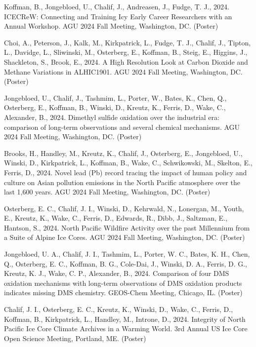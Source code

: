\documentclass[a4paper,11pt]{article}
\begin{document}
\item[\textbf{2024}] Koffman, B., Jongebloed, U., Chalif, J., Andreasen, J., Fudge, T. J., 2024. ICECReW: Connecting and Training Icy Early Career Researchers with an Annual Workshop. AGU 2024 Fall Meeting, Washington, DC. (Poster)

\item[] Choi, A., Peterson, J., Kalk, M., Kirkpatrick, L., Fudge, T. J., Chalif, J., Tipton, L., Davidge, L., Sliwinski, M., Osterberg, E., Koffman, B., Steig, E., Higgins, J., Shackleton, S., Brook, E., 2024. A High Resolution Look at Carbon Dioxide and Methane Variations in ALHIC1901. AGU 2024 Fall Meeting, Washington, DC. (Poster)

\item[] Jongebloed, U., Chalif, J., Tashmim, L., Porter, W., Bates, K., Chen, Q., Osterberg, E., Koffman, B., Winski, D., Kreutz, K., Ferris, D., Wake, C., Alexander, B., 2024. Dimethyl sulfide oxidation over the industrial era: comparison of long-term observations and several chemical mechanisms. AGU 2024 Fall Meeting, Washington, DC. (Poster)

\item[] Brooks, H., Handley, M., Kreutz, K., Chalif, J., Osterberg, E., Jongebloed, U., Winski, D., Kirkpatrick, L., Koffman, B., Wake, C., Schwikowski, M., Skelton, E., Ferris, D., 2024. Novel lead (Pb) record tracing the impact of human policy and culture on Asian pollution emissions in the North Pacific atmosphere over the last 1,600 years. AGU 2024 Fall Meeting, Washington, DC. (Poster)

\item[] Osterberg, E. C., Chalif, J. I., Winski, D., Kehrwald, N., Lonergan, M., Youth, E., Kreutz, K., Wake, C., Ferris, D., Edwards, R., Dibb, J., Saltzman, E., Hantson, S., 2024. North Pacific Wildfire Activity over the past Millennium from a Suite of Alpine Ice Cores. AGU 2024 Fall Meeting, Washington, DC. (Poster)

\item[] Jongebloed, U. A., Chalif, J. I., Tashmim, L., Porter, W. C., Bates, K. H., Chen, Q., Osterberg, E. C., Koffman, B. G., Cole-Dai, J., Winski, D. A., Ferris, D. G., Kreutz, K. J., Wake, C. P., Alexander, B., 2024. Comparison of four DMS oxidation mechanisms with long-term observations of DMS oxidation products indicates missing DMS chemistry. GEOS-Chem Meeting, Chicago, IL. (Poster)

\item[] Chalif, J. I., Osterberg, E. C., Kreutz, K., Winski, D., Wake, C., Ferris, D., Koffman, B., Kirkpatrick, L., Handley, M., Introne, D., 2024. Integrity of North Pacific Ice Core Climate Archives in a Warming World. 3rd Annual US Ice Core Open Science Meeting, Portland, ME. (Poster)
\end{document}
